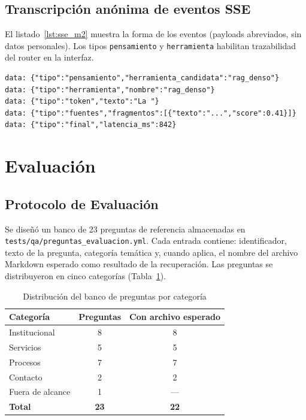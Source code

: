 \documentclass[conference]{IEEEtran}
\newcommand{\code}[1]{\texttt{\small #1}}
\begin{document}
\subsection{Transcripción anónima de eventos SSE}

El listado~\ref{lst:sse_m2} muestra la forma de los eventos (payloads
abreviados, sin datos personales). Los tipos \code{pensamiento} y
\code{herramienta} habilitan trazabilidad del router en la interfaz.

\begin{lstlisting}[caption={Secuencia SSE ilustrativa del agente (campos
abreviados)}, label={lst:sse_m2}]
data: {"tipo":"pensamiento","herramienta_candidata":"rag_denso"}
data: {"tipo":"herramienta","nombre":"rag_denso"}
data: {"tipo":"token","texto":"La "}
data: {"tipo":"fuentes","fragmentos":[{"texto":"...","score":0.41}]}
data: {"tipo":"final","latencia_ms":842}
\end{lstlisting}

\section{Evaluación}
\label{sec:eval}

\subsection{Protocolo de Evaluación}

Se diseñó un banco de 23 preguntas de referencia almacenadas en
\code{tests/qa/preguntas\_evaluacion.yml}. Cada entrada contiene:
identificador, texto de la pregunta, categoría temática y, cuando aplica,
el nombre del archivo Markdown esperado como resultado de la recuperación.
Las preguntas se distribuyeron en cinco categorías (Tabla~\ref{tab:categorias}).

\begin{table}[ht]
\centering
\caption{Distribución del banco de preguntas por categoría}
\label{tab:categorias}
\setlength{\tabcolsep}{4pt}
\begin{tabular}{@{}lcc@{}}
\toprule
\textbf{Categoría} & \textbf{Preguntas} & \textbf{Con archivo esperado} \\
\midrule
Institucional    & 8  & 8  \\
Servicios        & 5  & 5  \\
Procesos         & 7  & 7  \\
Contacto         & 2  & 2  \\
Fuera de alcance & 1  & --- \\
\midrule
\textbf{Total}   & \textbf{23} & \textbf{22} \\
\bottomrule
\end{tabular}
\end{table}
\end{document}
